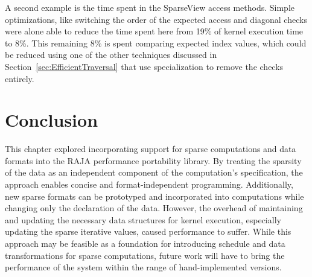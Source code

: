 A second example is the time spent in the SparseView access methods.
Simple optimizations, like switching the order of the expected access and diagonal checks were alone able to reduce the time spent here from 19\% of kernel execution time to 8\%.
This remaining 8\% is spent comparing expected index values, which could be reduced using one of the other techniques discussed in Section~\ref{sec:EfficientTraversal} that use specialization to remove the checks entirely.  


\section{Conclusion}

This chapter explored incorporating support for sparse computations and data formats into the RAJA performance portability library.
By treating the sparsity of the data as an independent component of the computation's specification, the approach enables concise and format-independent programming. 
Additionally, new sparse formats can be prototyped and incorporated into computations while changing only the declaration of the data.
However, the overhead of maintaining and updating the necessary data structures for kernel execution, especially updating the sparse iterative values, caused performance to suffer.
While this approach may be feasible as a foundation for introducing schedule and data transformations for sparse computations, future work will have to bring the performance of the system within the range of hand-implemented versions.






